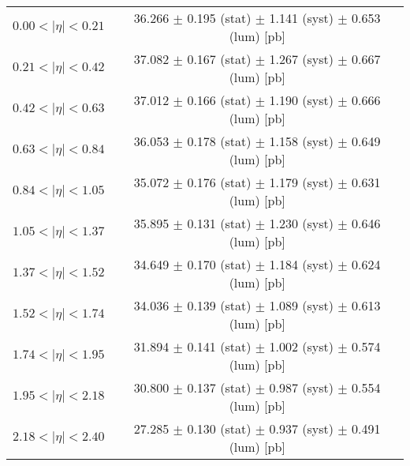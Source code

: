 \begin{tabular}{lc}
\hline
$0.00 < |\eta| <0.21$          & 36.266 $\pm$ 0.195 (stat) $\pm$ 1.141 (syst) $\pm$ 0.653 (lum) [pb]  \\
$0.21 < |\eta| <0.42$          & 37.082 $\pm$ 0.167 (stat) $\pm$ 1.267 (syst) $\pm$ 0.667 (lum) [pb]  \\
$0.42 < |\eta| <0.63$          & 37.012 $\pm$ 0.166 (stat) $\pm$ 1.190 (syst) $\pm$ 0.666 (lum) [pb]  \\
$0.63 < |\eta| <0.84$          & 36.053 $\pm$ 0.178 (stat) $\pm$ 1.158 (syst) $\pm$ 0.649 (lum) [pb]  \\
$0.84 < |\eta| <1.05$          & 35.072 $\pm$ 0.176 (stat) $\pm$ 1.179 (syst) $\pm$ 0.631 (lum) [pb]  \\
$1.05 < |\eta| <1.37$          & 35.895 $\pm$ 0.131 (stat) $\pm$ 1.230 (syst) $\pm$ 0.646 (lum) [pb]  \\
$1.37 < |\eta| <1.52$          & 34.649 $\pm$ 0.170 (stat) $\pm$ 1.184 (syst) $\pm$ 0.624 (lum) [pb]  \\
$1.52 < |\eta| <1.74$          & 34.036 $\pm$ 0.139 (stat) $\pm$ 1.089 (syst) $\pm$ 0.613 (lum) [pb]  \\
$1.74 < |\eta| <1.95$          & 31.894 $\pm$ 0.141 (stat) $\pm$ 1.002 (syst) $\pm$ 0.574 (lum) [pb]  \\
$1.95 < |\eta| <2.18$          & 30.800 $\pm$ 0.137 (stat) $\pm$ 0.987 (syst) $\pm$ 0.554 (lum) [pb]  \\
$2.18 < |\eta| <2.40$          & 27.285 $\pm$ 0.130 (stat) $\pm$ 0.937 (syst) $\pm$ 0.491 (lum) [pb]  \\
\hline
\end{tabular}
